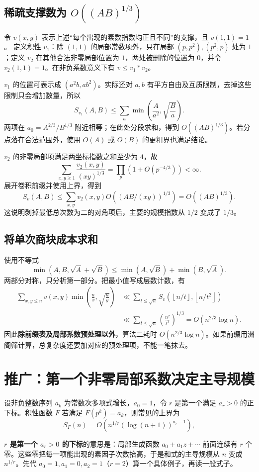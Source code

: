 \documentclass[UTF8,a4paper,11pt,twoside,openright,fontset=fandol]{ctexbook}
\theoremstyle{definition}
\newcommand{\floor}[1]{\left\lfloor #1\right\rfloor}
\begin{document}
\subsection{稀疏支撑数为 \texorpdfstring{$O((AB)^{1/3})$}{O((AB)1/3)}}
令 $v(x,y)$ 表示上述“每个出现的素数指数均正且不同”的支撑，且 $v(1,1)=1$。
定义积性 $v_1$：除 $(1,1)$ 的局部常数项外，只在局部 $(p,p^2),(p^2,p)$ 处为 $1$；定义 $v_2$ 在其他合法非零局部位置为 $1$，两处被删除的位置为 $0$，并令 $v_2(1,1)=1$。在非负系数意义下有 $v\le v_1*v_2$。

$v_1$ 的位置可表示成 $(a^2b,ab^2)$。实际还对 $a,b$ 有平方自由及互质限制，去掉这些限制只会增加数量，所以
\[
 S_{v_1}(A,B)\le\sum_a\min\left(\frac A{a^2},\sqrt{\frac Ba}\right).
\]
两项在 $a_0=A^{2/3}/B^{1/3}$ 附近相等；在此处分段求和，得到 $O((AB)^{1/3})$。若分点落在合法范围外，使用 $O(A)$ 或 $O(B)$ 的更粗界也满足结论。

$v_2$ 的非零局部项满足两坐标指数之和至少为 $4$，故
\[
 \sum_{x,y\ge1}\frac{v_2(x,y)}{(xy)^{1/3}}
 =\prod_p\left(1+O(p^{-4/3})\right)<\infty.
\]
展开卷积前缀并使用上界，得到
\[
 S_v(A,B)\le\sum_{x,y}v_2(x,y)
 O\!\left((AB/(xy))^{1/3}\right)=O((AB)^{1/3}).
\]
这说明剥掉最低总次数为二的对角项后，主要的规模指数从 $1/2$ 变成了 $1/3$。

\subsection{将单次商块成本求和}
使用不等式
\[
 \min(A,B,\sqrt A+\sqrt B)
 \le\min(A,\sqrt B)+\min(B,\sqrt A).
\]
两部分对称，只分析第一部分。把最小值写成层数计数，有
\[
\begin{aligned}
 \sum_{x,y\le n}v(x,y)\min\left(\frac nx,\sqrt{\frac ny}\right)
 &\ll\sum_{t\le\sqrt n}S_v(\floor{n/t},\floor{n/t^2})\\
 &\ll\sum_{t\le\sqrt n}\left(\frac{n^2}{t^3}\right)^{1/3}
 =O(n^{2/3}\log n).
\end{aligned}
\]
因此\textbf{除前缀表及局部系数预处理以外}，算法二耗时 $O(n^{2/3}\log n)$。如果前缀用洲阁筛计算，总复杂度还要加对应的预处理项，不能一笔抹去。


\section{推广：第一个非零局部系数决定主导规模}
设非负整数序列 $a_k$ 为常数次多项式增长，$a_0=1$，令 $r$ 是第一个满足 $a_r>0$ 的正下标。积性函数 $F$ 若满足 $F(p^k)=a_k$，则常见的上界为
\[
 S_F(n)=O\left(n^{1/r}(\log(n+1))^{a_r-1}\right),
\]

\begin{tip}
\textbf{$r$ 是第一个 $a_r>0$ 的下标}的意思是：局部生成函数 $a_0+a_1z+\cdots$ 前面连续有 $r$ 个零。这些零把每一项能出现的素因子次数抬高，于是和式的主导规模从 $n$ 变成 $n^{1/r}$。先代 $a_0=1,a_1=0,a_2=1$（$r=2$）算一个具体例子，再读一般式子。
\end{tip}
\end{document}
